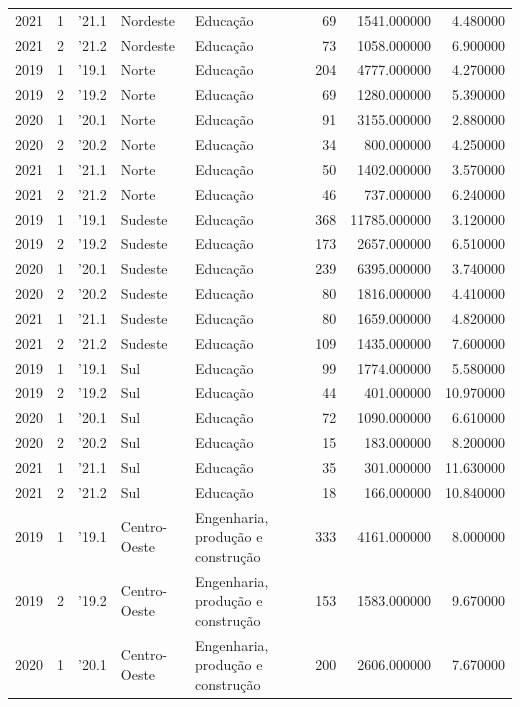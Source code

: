 \begin{longtable}{rrlllrrr}
2021 & 1 & '21.1 & Nordeste & Educação & 69 & 1541.000000 & 4.480000 \\
2021 & 2 & '21.2 & Nordeste & Educação & 73 & 1058.000000 & 6.900000 \\
2019 & 1 & '19.1 & Norte & Educação & 204 & 4777.000000 & 4.270000 \\
2019 & 2 & '19.2 & Norte & Educação & 69 & 1280.000000 & 5.390000 \\
2020 & 1 & '20.1 & Norte & Educação & 91 & 3155.000000 & 2.880000 \\
2020 & 2 & '20.2 & Norte & Educação & 34 & 800.000000 & 4.250000 \\
2021 & 1 & '21.1 & Norte & Educação & 50 & 1402.000000 & 3.570000 \\
2021 & 2 & '21.2 & Norte & Educação & 46 & 737.000000 & 6.240000 \\
2019 & 1 & '19.1 & Sudeste & Educação & 368 & 11785.000000 & 3.120000 \\
2019 & 2 & '19.2 & Sudeste & Educação & 173 & 2657.000000 & 6.510000 \\
2020 & 1 & '20.1 & Sudeste & Educação & 239 & 6395.000000 & 3.740000 \\
2020 & 2 & '20.2 & Sudeste & Educação & 80 & 1816.000000 & 4.410000 \\
2021 & 1 & '21.1 & Sudeste & Educação & 80 & 1659.000000 & 4.820000 \\
2021 & 2 & '21.2 & Sudeste & Educação & 109 & 1435.000000 & 7.600000 \\
2019 & 1 & '19.1 & Sul & Educação & 99 & 1774.000000 & 5.580000 \\
2019 & 2 & '19.2 & Sul & Educação & 44 & 401.000000 & 10.970000 \\
2020 & 1 & '20.1 & Sul & Educação & 72 & 1090.000000 & 6.610000 \\
2020 & 2 & '20.2 & Sul & Educação & 15 & 183.000000 & 8.200000 \\
2021 & 1 & '21.1 & Sul & Educação & 35 & 301.000000 & 11.630000 \\
2021 & 2 & '21.2 & Sul & Educação & 18 & 166.000000 & 10.840000 \\
2019 & 1 & '19.1 & Centro-Oeste & Engenharia, produção e construção & 333 & 4161.000000 & 8.000000 \\
2019 & 2 & '19.2 & Centro-Oeste & Engenharia, produção e construção & 153 & 1583.000000 & 9.670000 \\
2020 & 1 & '20.1 & Centro-Oeste & Engenharia, produção e construção & 200 & 2606.000000 & 7.670000 \\

\end{longtable}
